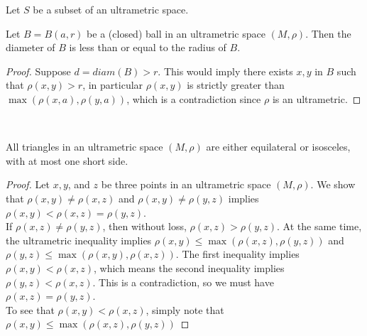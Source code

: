 \begin{definition}
Let $S$ be a subset of an ultrametric space. 
\end{definition}

\begin{proposition}
	Let $B=B(a, r)$ be a (closed) ball in an ultrametric space $(M,\rho)$. Then the diameter of $B$ is less than or equal to the radius of $B$.    
\end{proposition}

\begin{proof}
Suppose $d = diam(B) > r$. This would imply there exists $x,y$ in $B$ such that $\rho(x,y) > r$, in particular $\rho(x,y)$ is strictly greater than $\max(\rho(x,a), \rho(y,a))$, which is a contradiction since $\rho$ is an ultrametric.
\end{proof}

\\

\begin{proposition}
	 All triangles in an ultrametric space $(M,\rho)$ are either equilateral or isosceles, with at most one short side. 
\end{proposition}

\begin{proof}
Let $x,y$, and $z$ be three points in an ultrametric space $(M,\rho)$. We show that $\rho(x,y) \neq \rho(x,z)$ and $\rho(x,y) \neq \rho(y,z)$ implies $\rho(x,y) < \rho(x,z) = \rho(y,z)$.\\

If $\rho(x,z) \neq \rho(y,z)$, then without loss, $\rho(x,z) > \rho(y,z)$. At the same time, the ultrametric inequality implies $\rho(x,y) \leq \max(\rho(x,z), \rho(y,z))$ and  $\rho(y,z) \leq \max(\rho(x,y), \rho(x,z))$. The first inequality implies $\rho(x,y) < \rho(x,z)$, which means the second inequality implies $\rho(y,z) < \rho(x,z)$. This is a contradiction, so we must have $\rho(x,z) = \rho(y,z)$.\\

To see that $\rho(x,y) < \rho(x,z)$, simply note that $\rho(x,y) \leq \max(\rho(x,z), \rho(y,z))$
\end{proof}

